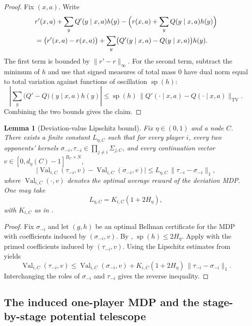 \documentclass[12pt]{article}
\newtheorem{lemma}[theorem]{Lemma}
\theoremstyle{definition}
\newcommand{\1}{\mathbf{1}}
\DeclareMathOperator{\spn}{sp}
\begin{document}
\begin{proof}
Fix $(x,a)$. Write
\begin{align*}
&r'(x,a)+\sum_y Q'(y\mid x,a)h(y)
-
\Bigl(r(x,a)+\sum_y Q(y\mid x,a)h(y)\Bigr)
\\
&= \bigl(r'(x,a)-r(x,a)\bigr)
+
\sum_y\bigl(Q'(y\mid x,a)-Q(y\mid x,a)\bigr)h(y).
\end{align*}
The first term is bounded by $\|r'-r\|_\infty$. For the second term, subtract the
minimum of $h$ and use that signed measures of total mass $0$ have dual norm equal
to total variation against functions of oscillation $\spn(h)$:
\[
\left|\sum_y\bigl(Q'-Q\bigr)(y\mid x,a)h(y)\right|
\le
\spn(h)\,\|Q'(\cdot\mid x,a)-Q(\cdot\mid x,a)\|_{\mathrm{TV}}.
\]
Combining the two bounds gives the claim.
\end{proof}

\begin{lemma}[Deviation-value Lipschitz bound]
\label{lem:deviation-lipschitz}
Fix $\eta\in(0,1)$ and a node $C$. There exists a finite constant $L_{\eta,C}$
such that for every player $i$, every two opponents' kernels
$\sigma_{-i},\tau_{-i}\in\prod_{j\ne i}\Sigma_{j,C}$, and every continuation vector
$v\in[0,d_\eta(C)-1]^{B_C\times N}$,
\[
\bigl|\operatorname{Val}_{i,C}(\tau_{-i},v)-\operatorname{Val}_{i,C}(\sigma_{-i},v)\bigr|
\le L_{\eta,C}\,\|\tau_{-i}-\sigma_{-i}\|_1,
\]
where $\operatorname{Val}_{i,C}(\cdot,v)$ denotes the optimal average reward of the
deviation MDP. One may take
\[
L_{\eta,C}=K_{i,C}(1+2H_\eta),
\]
with $K_{i,C}$ as in .
\end{lemma}

\begin{proof}
Fix $\sigma_{-i}$ and let $(g,h)$ be an optimal Bellman certificate for the MDP with
coefficients induced by $(\sigma_{-i},v)$. By ,
$\spn(h)\le 2H_\eta$. Apply  with the primed
coefficients induced by $(\tau_{-i},v)$. Using the Lipschitz estimates from
 yields
\[
\operatorname{Val}_{i,C}(\tau_{-i},v)
\le
\operatorname{Val}_{i,C}(\sigma_{-i},v)
+
K_{i,C}(1+2H_\eta)\,\|\tau_{-i}-\sigma_{-i}\|_1.
\]
Interchanging the roles of $\sigma_{-i}$ and $\tau_{-i}$ gives the reverse
inequality.
\end{proof}




\subsection{The induced one-player MDP and the stage-by-stage potential telescope}
\end{document}
